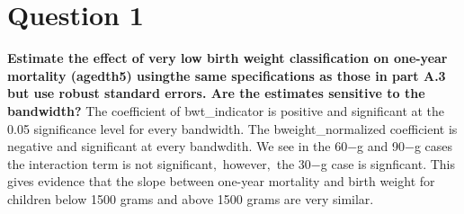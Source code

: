 \documentclass{article}
\begin{document}
\section*{Question 1}
\textbf{Estimate the effect of very low birth weight classification on one-year mortality (agedth5) usingthe same specifications as those in part A.3 but use robust standard errors.  Are the estimates sensitive to the bandwidth?}
\newline \newline
The coefficient of bwt\_indicator is positive and significant at the 0.05 significance level for every bandwidth. The bweight\_normalized coefficient is negative and significant at every bandwdith. We see in the 60$-$g and 90$-$g cases the interaction term is not significant$,$ however$,$ the 30$-$g case is signficant. This gives evidence that the slope between one-year mortality and birth weight for children below 1500 grams and above 1500 grams are very similar.
\end{document}
